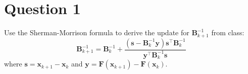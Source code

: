 \section{Question 1}

\begin{question}
    Use the Sherman-Morrison formula to derive the update for $\mathbf{B}_{k+1}^{-1}$ from class:
    \begin{equation*}
        \mathbf{B}_{k+1}^{-1} = \mathbf{B}_{k}^{-1} + \frac{(\mathbf{s}-\mathbf{B}_k^{-1}\mathbf{y})\mathbf{s}^\top\mathbf{B}_k^{-1}}{\mathbf{y}^\top \mathbf{B}_k^{-1}\mathbf{s}}
    \end{equation*}
    where $\mathbf{s} = \mathbf{x}_{k+1}-\mathbf{x}_k$ and $\mathbf{y} =\mathbf{F}(\mathbf{x}_{k+1}) - \mathbf{F}(\mathbf{x}_k)$.
\end{question}

\begin{answer}
    
\end{answer}